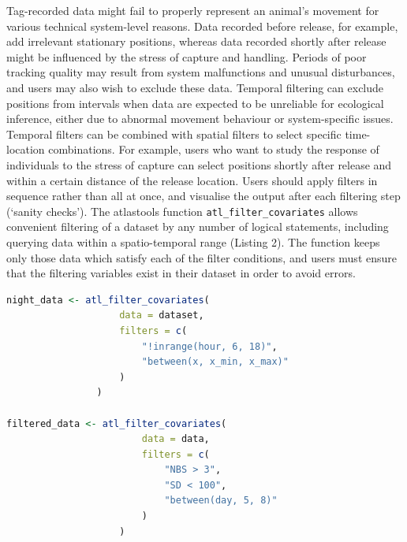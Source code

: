 \documentclass[10pt,paper=a4,headings=standardclasses
]{scrartcl}
\begin{document}
Tag-recorded data might fail to properly represent an animal’s movement for various technical system-level reasons. Data recorded before release, for example, add irrelevant stationary positions, whereas data recorded shortly after release might be influenced by the stress of capture and handling.
Periods of poor tracking quality may result from system malfunctions and unusual disturbances, and users may also wish to exclude these data.
Temporal filtering can exclude positions from intervals when data are expected to be unreliable for ecological inference, either due to abnormal movement behaviour or system-specific issues.  
Temporal filters can be combined with spatial filters to select specific time-location combinations. 
For example, users who want to study the response of individuals to the stress of capture can select positions shortly after release and within a certain distance of the release location.
Users should apply filters in sequence rather than all at once, and visualise the output after each filtering step (`sanity checks').
The atlastools function \texttt{atl\_filter\_covariates} allows convenient filtering of a dataset by any number of logical statements, including querying data within a spatio-temporal range (Listing 2).
The function keeps only those data which satisfy each of the filter conditions, and users must ensure that the filtering variables exist in their dataset in order to avoid errors.

\begin{lstlisting}[float, language=R, style=customR, caption = {
    Data can be filtered by a temporal or a spatio-temporal range using \texttt{atl\_filter\_covariates}. 
    Filter conditions are passed to the \texttt{filters} argument as a character vector. 
    Only rows in the data satisfying \textit{all} the conditions are retained. 
    Here, the first example shows how nighttime data can be retained using a predicate that determines whether the value of `hour' is between 6 and 18, and also within a range of X coordinates.
    The second example retains ATLAS locations calculated using $>$ 3 base stations (\texttt{NBS}), with location error (\texttt{SD}) $<$ 100, and data between an arbitrary day 5 and day 8.
    }]
night_data <- atl_filter_covariates(
                    data = dataset,
                    filters = c(
                        "!inrange(hour, 6, 18)",
                        "between(x, x_min, x_max)"
                    )
                )

filtered_data <- atl_filter_covariates(
                        data = data,
                        filters = c(
                            "NBS > 3",
                            "SD < 100",
                            "between(day, 5, 8)"
                        )
                    )                            
\end{lstlisting}
\end{document}
